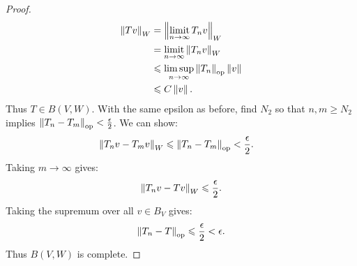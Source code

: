 \begin{proof}
\begin{equation*}
\begin{split}
                    \left\lVert Tv \right\rVert_{W}
                    & = \left\lVert \operatorname*{limit}_{n\rightarrow \infty}T_n v \right\rVert_{W} \\
                    & = \operatorname*{limit}_{n \rightarrow \infty} \left\lVert T_n v \right\rVert_W \\
                    & \leqslant \limsup_{n \rightarrow \infty} \left\lVert T_n \right\rVert_{\operatorname{op}}\left\lVert v \right\rVert \\
                    & \leqslant C \left\lVert v \right\rVert.
                \end{split}
                \end{equation*}
            Thus $T \in B(V,W)$. With the same epsilon as before, find $N_2$ so that $n,m \geq N_2$ implies $\left\lVert T_n - T_m \right\rVert_{\operatorname{op}} < \frac{\epsilon}{2}$. We can show:
                \begin{equation*}
                \begin{split}
                    \left\lVert T_nv - T_mv \right\rVert_{W}
                    & \leqslant \left\lVert T_n - T_m \right\rVert_{\operatorname{op}} < \frac{\epsilon}{2}.
                \end{split}
                \end{equation*}
            Taking $m \rightarrow \infty$ gives:
                \begin{equation*}
                \begin{split}
                    \left\lVert T_nv - Tv \right\rVert_{W} \leqslant \frac{\epsilon}{2}.
                \end{split}
                \end{equation*}
            Taking the supremum over all $v \in B_V$ gives:
                \begin{equation*}
                \begin{split}
                    \left\lVert T_n - T \right\rVert_{\operatorname{op}} \leqslant \frac{\epsilon}{2} < \epsilon.
                \end{split}
                \end{equation*}
            Thus $B(V,W)$ is complete.
        \end{proof}


